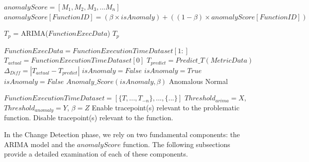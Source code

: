 \documentclass[pdflatex,sn-nature]{sn-jnl}%
\theoremstyle{thmstyleone}%
\theoremstyle{thmstyletwo}%
\theoremstyle{thmstylethree}%
\begin{document}
\begin{algorithm}[tbp]

  \caption{Change Detection Algorithm}\label{changedetect}

  \begin{algorithmic}[1]

    \State $anomalyScore=[M_1, M_2, M_3,...M_n]$
        \State $anomalyScore[FunctionID]=(\beta \times isAnomaly)+((1 - \beta) \times anomalyScore[FunctionID])$
    \EndFunction
    
        \State $T_p$ = ARIMA($FunctionExecData$)
        \State \Return $T_p$
    \EndFunction
    
        \State $FunctionExecData=FunctionExecutionTimeDataset[1:]$
        \State $T_{actual} = FunctionExecutionTimeDataset[0]$
        \State $T_{predict} = Predict\_T(MetricData)$
        \State $\Delta_{Diff} = |T_{actual} - T_{predict}|$
        \State $isAnomaly=False$
            \State $isAnomaly=True$
        \Else
            \State $isAnomaly=False$
        \EndIf
        \State $Anomaly\_Score(isAnomaly,\beta)$
            \State \Return Anomalous
        \Else
            \State \Return Normal
        \EndIf
    \EndFunction

    \State $FunctionExecutionTimeDataset=[\{T,...,T_{-n}\},...,\{...\}]$
    \State $Threshold_{arima}=X$, $Threshold_{anomaly}=Y$, $\beta=Z$
            \State Enable tracepoint(s) relevant to the problematic function.
        \Else
            \State Disable tracepoint(s) relevant to the function.
        \EndIf
    \EndFor
        
  \end{algorithmic}
\end{algorithm}

In the Change Detection phase, we rely on two fundamental components: the ARIMA model and the $anomalyScore$ function. The following subsections provide a detailed examination of each of these components. 
\end{document}

